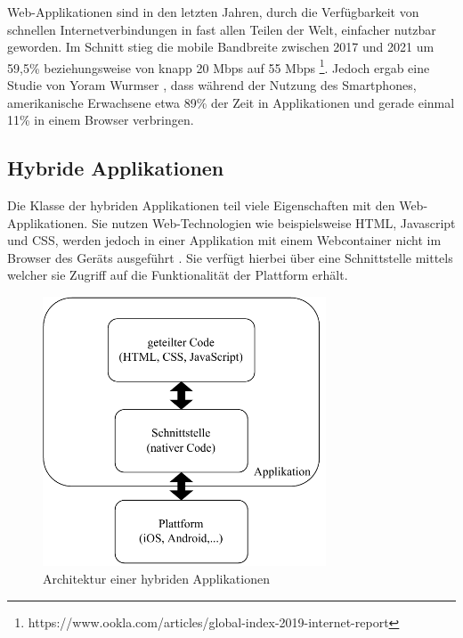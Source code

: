 Web-Applikationen sind in den letzten Jahren, durch die Verfügbarkeit von schnellen Internetverbindungen in fast allen Teilen der Welt, einfacher nutzbar geworden.
Im Schnitt stieg die mobile Bandbreite zwischen 2017 und 2021 um 59,5\% beziehungsweise von knapp 20 Mbps auf 55 Mbps \footnote{https://www.ookla.com/articles/global-index-2019-internet-report}.
Jedoch ergab eine Studie von Yoram Wurmser \cite{report_webusage}, dass während der Nutzung des Smartphones, amerikanische Erwachsene etwa 89\% der Zeit in Applikationen und gerade einmal 11\% in einem Browser verbringen.

\subsection{Hybride Applikationen}
\label{cha:3_hybrid}
Die Klasse der hybriden Applikationen teil viele Eigenschaften mit den Web-Applikationen.
Sie nutzen Web-Technologien wie beispielsweise HTML, Javascript und CSS, werden jedoch in einer Applikation mit einem Webcontainer nicht im Browser des Geräts ausgeführt \cite{IEEE_development_classes}.
Sie verfügt hierbei über eine Schnittstelle mittels welcher sie Zugriff auf die Funktionalität der Plattform erhält.

\begin{figure}[ht]
  \centering
  \includegraphics[height=8cm,keepaspectratio]{images/hybrid_architecture.drawio.pdf} 
  \caption{Architektur einer hybriden Applikationen}
  \label{fig:hybrid_architecture}
\end{figure}

